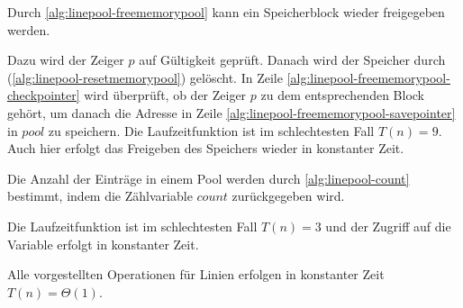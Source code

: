 Durch \autoref{alg:linepool-freememorypool} kann ein Speicherblock wieder freigegeben werden.

Dazu wird der Zeiger $p$ auf Gültigkeit geprüft. Danach wird der Speicher durch 
 (\autoref{alg:linepool-resetmemorypool}) gelöscht. In Zeile \ref{alg:linepool-freememorypool-checkpointer} wird
 überprüft, ob der Zeiger $p$ zu dem entsprechenden Block gehört, um danach die Adresse in Zeile
 \ref{alg:linepool-freememorypool-savepointer} in $\mathit{pool}$ zu speichern. Die Laufzeitfunktion ist im
 schlechtesten Fall $T(n) = 9$. Auch hier erfolgt das Freigeben des Speichers wieder in konstanter Zeit.

Die Anzahl der Einträge in einem Pool werden durch \autoref{alg:linepool-count} bestimmt, indem die Zählvariable
 $\mathit{count}$ zurückgegeben wird.

Die Laufzeitfunktion ist im schlechtesten Fall $T(n) = 3$ und der Zugriff auf die Variable erfolgt in konstanter Zeit.


Alle vorgestellten Operationen für Linien erfolgen in konstanter Zeit $T(n) = \Theta(1)$.

